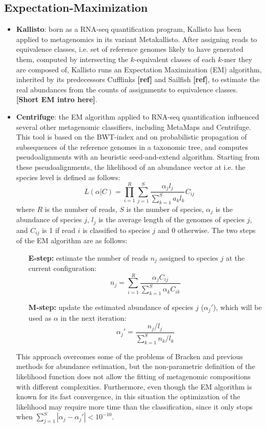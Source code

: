 \subsection{Expectation-Maximization}
\begin{itemize}
    \item \textbf{Kallisto}: born as a RNA-seq quantification program, Kallisto has been applied to metagenomics in its variant Metakallisto. After assigning reads to equivalence classes, i.e. set of reference genomes likely to have generated them, computed by intersecting the $k$-equivalent classes of each $k$-mer they are composed of, Kallisto runs an Expectation Maximization (EM) algorithm, inherited by its predecessors Cufflinks \textbf{[ref]} and Sailfish  \textbf{[ref]}, to estimate the real abundances from the counts of assignments to equivalence classes. \textbf{[Short EM intro here]}.
    \item \textbf{Centrifuge}: the EM algorithm applied to RNA-seq quantification influenced several other metagenomic classifiers, including MetaMaps and Centrifuge. This tool is based on the BWT-index and on probabilistic propagation of subsequences of the reference genomes in a taxonomic tree, and computes pseudoalignments with an heuristic seed-and-extend algorithm. Starting from these pseudoalignments, the likelihood of an abundance vector at i.e. the species level is defined as follows:
    \begin{equation*}
      L(\alpha|C) = \prod_{i=1}^R \sum_{j=1}^S \frac{\alpha_j l_j}{\sum_{k=1}^S a_k l_k} C_{ij}
    \end{equation*}
    where $R$ is the number of reads, $S$ is the number of species, $\alpha_j$ is the abundance of species $j$, $l_j$ is the average length of the genomes of species $j$, and $C_{ij}$ is 1 if read $i$ is classified to species $j$ and 0 otherwise. The two steps of the EM algorithm are as follows:
    \begin{itemize}
      \item[\textbf{E-step:}] estimate the number of reads $n_j$ assigned to species $j$ at the current configuration:
      \begin{equation*}
        n_j = \sum_{i=1}^R \frac{\alpha_j C_{ij}}{\sum_{k=1}^S \alpha_k C_{ik}}
      \end{equation*}
      \item[\textbf{M-step:}] update the estimated abundance of species $j$ ($\alpha_j'$), which will be used as $\alpha$ in the next iteration:
      \begin{equation*}
        \alpha_j' = \frac{n_j/l_j}{\sum_{k=1}^S n_k/l_k}
      \end{equation*}
    \end{itemize}
    This approach overcomes some of the problems of Bracken and previous methods for abundance estimation, but the non-parametric definition of the likelihood function does not allow the fitting of metagenomic compositions with different complexities. Furthermore, even though the EM algorithm is known for its fast convergence, in this situation the optimization of the likelihood may require more time than the classification, since it only stops when $\sum_{j=1}^S |\alpha_j - \alpha_j'| < 10^{-10}$.
\end{itemize}

